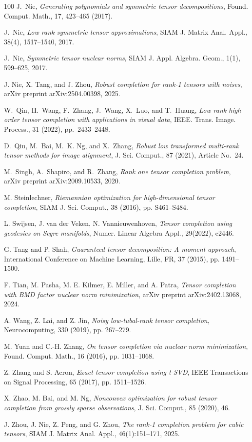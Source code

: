 \documentclass{amsart}
\theoremstyle{definition}
\numberwithin{equation}{section}
\begin{document}
\begin{thebibliography}{100}
{\sc J.~Nie}, 
{\em Generating polynomials and symmetric tensor decompositions},
Found. Comput. Math., 
17, 423--465 (2017). 

{\sc J.~Nie}, 
{\em Low rank symmetric tensor approximations},
SIAM J. Matrix Anal. Appl., 
38(4), 1517--1540, 2017.

{\sc J.~Nie}, 
{\em Symmetric tensor nuclear norms}, 
SIAM J. Appl. Algebra. Geom., 
1(1), 599--625, 2017.

{\sc J. Nie, X. Tang, and J. Zhou},
{\em Robust completion for rank-1 tensors with noises},
arXiv preprint arXiv:2504.00398, 2025.

{\sc W.~Qin, H.~Wang, F.~Zhang, J.~Wang, X.~Luo, and T.~Huang}, 
{\em Low-rank high-order tensor completion with applications in visual data}, 
IEEE. Trans. Image. Process.,
31 (2022), pp.~2433--2448.

{\sc D.~Qiu, M.~Bai, M.~K. Ng, and X.~Zhang}, 
{\em Robust low transformed multi-rank tensor methods for image alignment},
J. Sci. Comput., 
87 (2021), Article No.~24.

{\sc M.~Singh, A.~Shapiro, and R.~Zhang},
{\em Rank one tensor completion problem},
arXiv preprint arXiv:2009.10533, 2020.

{\sc M. Steinlechner}, 
{\em Riemannian optimization for high-dimensional tensor completion}, 
SIAM J. Sci. Comput., 
38 (2016), pp. S461--S484.

{\sc L. Swijsen, J. van der Veken, N. Vannieuwenhoven}, 
{\em Tensor completion using geodesics on Segre manifolds}, 
Numer. Linear Algebra Appl., 
29(2022), e2446.

{\sc G. Tang and P. Shah}, 
{\em Guaranteed tensor decomposition: A moment approach},
International Conference on Machine Learning, Lille, FR, 37 (2015), pp. 1491--1500.

{\sc F. Tian, M. Pasha, M. E. Kilmer, E. Miller, and A. Patra}, 
{\em Tensor completion with BMD factor nuclear norm minimization}, 
arXiv preprint arXiv:2402.13068, 2024.

{\sc A. Wang, Z. Lai, and Z. Jin}, 
{\em Noisy low-tubal-rank tensor completion}, 
Neurocomputing, 330 (2019), pp. 267--279.

{\sc M. Yuan and C.-H. Zhang}, 
{\em On tensor completion via nuclear norm minimization}, 
Found. Comput. Math., 
16 (2016), pp. 1031--1068.

{\sc Z. Zhang and S. Aeron}, 
{\em Exact tensor completion using t-SVD}, 
IEEE Transactions on Signal Processing, 65 (2017), pp. 1511--1526.

{\sc X. Zhao, M. Bai, and M. Ng}, 
{\em Nonconvex optimization for robust tensor completion from grossly sparse observations}, 
J. Sci. Comput., 
85 (2020), 46.

{\sc J. Zhou, J. Nie, Z. Peng, and G. Zhou},
{\em The rank-1 completion problem for cubic tensors},
SIAM J. Matrix Anal. Appl., 46(1):151--171, 2025.

\end{thebibliography}
\end{document}
